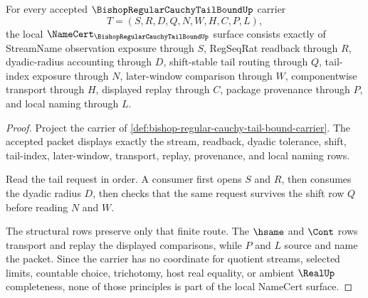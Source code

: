 \begin{theorem}
\label{thm:bishop-regular-cauchy-tail-bound-namecert-obligations}
For every accepted $\BishopRegularCauchyTailBoundUp$ carrier
$$
T=(S,R,D,Q,N,W,H,C,P,L),
$$
the local $\NameCert_{\BishopRegularCauchyTailBoundUp}$ surface consists exactly of StreamName observation exposure through $S$, RegSeqRat readback through $R$, dyadic-radius accounting through $D$, shift-stable tail routing through $Q$, tail-index exposure through $N$, later-window comparison through $W$, componentwise transport through $H$, displayed replay through $C$, package provenance through $P$, and local naming through $L$.
\end{theorem}
\begin{proof}
Project the carrier of \autoref{def:bishop-regular-cauchy-tail-bound-carrier}. The accepted packet displays exactly the stream, readback, dyadic tolerance, shift, tail-index, later-window, transport, replay, provenance, and local naming rows.

Read the tail request in order. A consumer first opens $S$ and $R$, then consumes the dyadic radius $D$, then checks that the same request survives the shift row $Q$ before reading $N$ and $W$.

The structural rows preserve only that finite route. The $\hsame$ and $\Cont$ rows transport and replay the displayed comparisons, while $P$ and $L$ source and name the packet. Since the carrier has no coordinate for quotient streams, selected limits, countable choice, trichotomy, host real equality, or ambient $\RealUp$ completeness, none of those principles is part of the local NameCert surface.
\end{proof}

